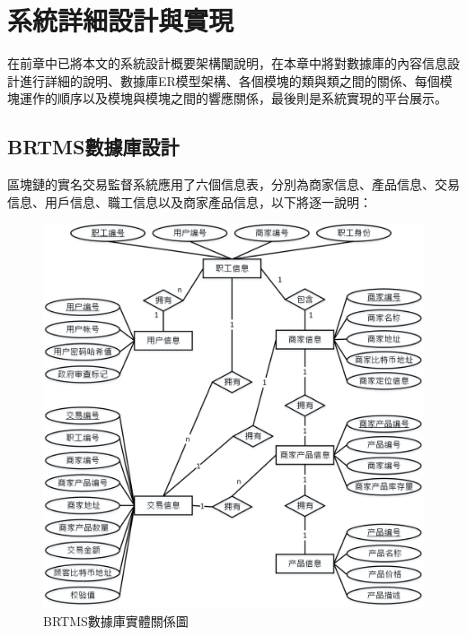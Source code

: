 \chapter{系統詳細設計與實現}
在前章中已將本文的系統設計概要架構闡說明，在本章中將對數據庫的內容信息設計進行詳細的說明、數據庫ER模型架構、各個模塊的類與類之間的關係、每個模塊運作的順序以及模塊與模塊之間的響應關係，最後則是系統實現的平台展示。

	\section{BRTMS數據庫設計}

	區塊鏈的實名交易監督系統應用了六個信息表，分別為商家信息、產品信息、交易信息、用戶信息、職工信息以及商家產品信息，以下將逐一說明：

		\begin{figure}[htbp]
			\centering
			\includegraphics[width = 1\textwidth]{er.jpg}
			\caption{BRTMS數據庫實體關係圖}\label{db}
		\end{figure}

